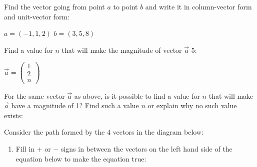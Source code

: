 \documentclass[12pt, twoside]{article}
\begin{document}
\begin{enumerate}
    
    \newpage
    \item Find the vector going from point $a$ to point $b$ and write it in column-vector form and unit-vector form:
    
    \begin{center}
        $a = (-1, 1, 2)$ \hspace{1cm} $b = (3, 5, 8)$
    \end{center}

    \vspace{4cm}
    
    \item Find a value for $n$ that will make the magnitude of vector $\vec{a}$ 5:
    
    \begin{center}
        \item $\vec{a} = \begin{pmatrix} 1 \\ 2 \\ n \end{pmatrix}$
    \end{center}

    \vspace{4cm}

    For the same vector $\vec{a}$ as above, is it possible to find a value for $n$ that will make $\vec{a}$ have a magnitude of 1? Find such a value $n$ or explain why no such value exists:
    
    \newpage

    \item Consider the path formed by the 4 vectors in the diagram below:
    \begin{center}
    \end{center}
    
    \begin{enumerate}
        \item Fill in $+$ or $-$ signs in between the vectors on the left hand side of the equation below to make the equation true:


\end{enumerate}
\end{enumerate}
\end{document}
